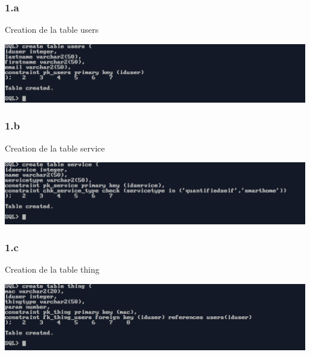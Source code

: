 \subsubsection*{1.a}
Creation de la table users 



\begin{center}
    \includegraphics[width=\textwidth]{ScreenShot/Partie2/createTable/users.png}
\end{center}

\vspace{0.25cm}
\subsubsection*{1.b}
Creation de la table service 



\begin{center}
    \includegraphics[width=\textwidth]{ScreenShot/Partie2/createTable/service.png}
\end{center}

\newpage
\subsubsection*{1.c}
Creation de la table thing 



\begin{center}
    \includegraphics[width=\textwidth]{ScreenShot/Partie2/createTable/thing.png}
\end{center}


